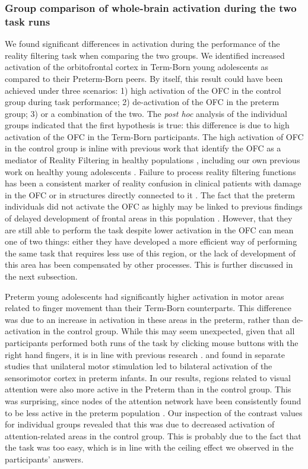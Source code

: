 \subsubsection{Group comparison of whole-brain activation during the two task runs}
We found significant differences in activation during the performance of the reality filtering task when comparing the two groups. We identified increased activation of the orbitofrontal cortex in Term-Born young adolescents as compared to their Preterm-Born peers. By itself, this result could have been achieved under three scenarios: 1) high activation of the OFC in the control group during task performance; 2) de-activation of the OFC in the preterm group; 3) or a combination of the two.  The \textit{post hoc} analysis of the individual groups indicated that the first hypothesis is true: this difference is due to high activation of the OFC in the Term-Born participants. The high activation of OFC in the control group is inline with previous work that identify the OFC as a mediator of Reality Filtering in healthy populations \citep{Schnider2000, Treyer2003,Bouzerda-Wahlen2015, Schnider2018, Theze2019}, including our own previous work on healthy young adolescents \citep{Liverani2020}. Failure to process reality filtering functions has been a consistent marker of reality confusion in clinical patients with damage in the OFC or in structures directly connected to it \citep{Schnider1999, Nahum2012}. The fact that the preterm individuals did not activate the OFC as highly may be linked to previous findings of delayed development of frontal areas in this population \citep{Nosarti2014, Sripada2018}. However, that they are still able to perform the task despite lower activation in the OFC can mean one of two things: either they have developed a more efficient way of performing the same task that requires less use of this region, or the lack of development of this area has been compensated by other processes. This is further discussed in the next subsection.

Preterm young adolescents had significantly higher activation in motor areas related to finger movement than their Term-Born counterparts. This difference was due to an increase in activation in these areas in the preterm, rather than de-activation in the control group. While this may seem unexpected, given that all participants performed both runs of the task by clicking mouse buttons with the right hand fingers, it is in line with previous research \citep{Heep2009, Arichi2010, Allievi2016}. \citet{Heep2009} and  \citet{Arichi2010} found in separate studies that unilateral motor stimulation led to bilateral activation of the sensorimotor cortex in preterm infants. In our results, regions related to visual attention were also more active in the Preterm than in the control group. This was surprising, since nodes of the attention network have been consistently found to be less active in the preterm population \citep{Olsen2018}. Our inspection of the contrast values for individual groups revealed that this was due to decreased activation of attention-related areas in the control group. This is probably due to the fact that the task was too easy, which is in line with the ceiling effect we observed in the participants' answers.

